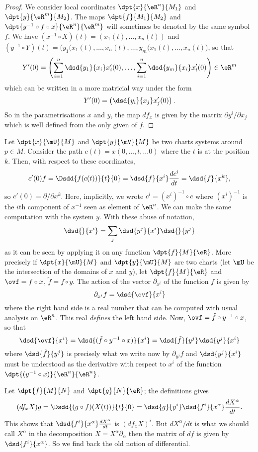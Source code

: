 \begin{proof}
We consider local coordinates $\dpt{x}{\eR^n}{M_1}$ and $\dpt{y}{\eR^m}{M_2}$. The maps $\dpt{f}{M_1}{M_2}$ and $\dpt{y^{-1}\circ f\circ x}{\eR^n}{\eR^m}$ will sometimes be denoted by the same symbol $f$. We have $(x^{-1}\circ X)(t)=(x_1(t),\ldots,x_n(t))$ and $(y^{-1}\circ Y)(t)=\big( y_1(x_1(t),\ldots,x_n(t),\ldots, y_m(x_1(t),\ldots,x_n(t)  \big)$, so that
\[
  Y'(0)=\left(   \sum_{i=1}^n \dsd{y_1}{x_i}x_i'(0),\ldots,\sum_{i=1}^n \dsd{y_m}{x_i}x_i'(0)   \right)\in\eR^m
\]
which can be written in a more matricial way under the form
\[
   Y'(0)=\left( \dsd{y_i}{x_j}x'_j(0) \right).
\]
So in the parametrisations $x$ and $y$, the map $df_x$ is given by the matrix $\partial y^i/\partial x_j$ which is well defined from the only given of $f$.
\end{proof}


Let $\dpt{x}{\mU}{M}$ and $\dpt{y}{\mV}{M}$ be two charts systems around $p\in M$. Consider the path $c(t)=x(0,\ldots,t,\ldots 0)$ where the $t$ is at the position $k$. Then, with respect to these coordinates,
\[
  c'(0)f=\Dsdd{ f(c(t))  }{t}{0}=\dsd{f}{x^i}\frac{dc^i}{dt}=\dsd{f}{x^k},
\]
so $c'(0)=\partial/\partial x^k$. Here, implicitly, we wrote $c^i=(x^i)^{-1}\circ c$ where $(x^i)^{-1}$ is the $i$th component of $x^{-1}$ seen as element of $\eR^n$. We can make the same computation with the system $y$. With these abuse of notation,
\begin{equation}
   \dsd{}{x^i}=\sum_j\dsd{y^j}{x^i}\dsd{}{y^j}
\end{equation}
as it can be seen by applying it on any function $\dpt{f}{M}{\eR}$. More precisely if $\dpt{x}{\mU}{M}$ and $\dpt{y}{\mU}{M}$ are two charts (let $\mU$ be the intersection of the domains of $x$ and $y$), let $\dpt{f}{M}{\eR}$ and $\ovf=f\circ x$, $\tilde f =f\circ y$. The action of the vector $\partial_{x^i}$ of the function $f$ is given by
\[
  \partial_{x^i}f=\dsd{\ovf}{x^i}
\]
where the right hand side is a real number that can be computed with usual analysis on $\eR^n$. This real \emph{defines} the left hand side. Now, $\ovf=\tilde f \circ y^{-1}\circ x$, so that
\[
   \dsd{\ovf}{x^i}=\dsd{ (\tilde f \circ y^{-1}\circ x) }{x^i}=\dsd{\tilde f }{y^j}\dsd{y^j}{x^i}
\]
where $\dsd{\tilde f }{y^j}$ is precisely what we write now by $\partial_{y^j}f$ and $\dsd{y^j}{x^i}$ must be understood as the derivative with respect to $x^i$ of the function $\dpt{(y^{-1}\circ x)}{\eR^n}{\eR^n}$.

Let $\dpt{f}{M}{N}$ and $\dpt{g}{N}{\eR}$; the definitions gives
\[
  (df_xX)g=\Dsdd{(g\circ f)(X(t))}{t}{0}
          =\dsd{g}{y^i}\dsd{f^i}{x^{\alpha}}\frac{dX^{\alpha}}{dt}.
\]
This shows that $\dsd{f^i}{x^{\alpha}}\frac{dX^{\alpha}}{dt}$ is $(df_xX)^i$.  But $dX^{\alpha}/dt$ is what we should call $X^{\alpha}$ in the decomposition $X=X^{\alpha}\partial_{\alpha}$ then the matrix of $df$ is given by $\dsd{f^i}{x^{\alpha}}$. So we find back the old notion of differential.

